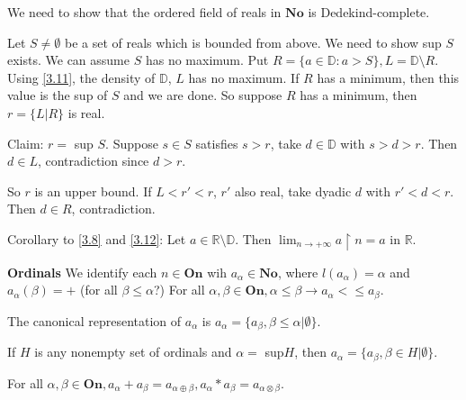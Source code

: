 
We need to show that the ordered field of reals in $\mathbf{No}$ is Dedekind-complete.

Let $S \neq \emptyset$ be a set of reals which is bounded from above. We need to show sup $S$ exists. We can assume $S$ has no maximum. Put $R=\{a \in \mathbb{D}: a>S\}, L=\mathbb{D} \setminus R$. Using \eqref{3.11}, the density of $\mathbb{D}$, $L$ has no maximum. If $R$ has a minimum, then this value is the sup of $S$ and we are done. So suppose $R$ has a minimum, then $r=\{L|R\}$ is real.

Claim: $r=$ sup $S$. Suppose $s \in S$ satisfies $s>r$, take $d \in \mathbb{D}$ with $s>d>r$. Then $d \in L$, contradiction since $d>r$.

So $r$ is an upper bound. If $L<r'<r$, $r'$ also real, take dyadic $d$ with $r'<d<r$. Then $d \in R$, contradiction.

\begin{corollary} %
Corollary to \eqref{3.8} and \eqref{3.12}: Let $a \in \mathbb{R} \setminus \mathbb{D}$. Then $\lim_{n \to +\infty} a \restriction n =a$ in $\mathbb{R}$.
 \end{corollary}

\textbf{Ordinals}
We identify each $n \in \mathbf{On}$ wih $a_\alpha \in \mathbf{No}$, where $l(a_\alpha)=\alpha$ and $a_{\alpha}(\beta)=+$ (for all $\beta \leq \alpha$?) For all $\alpha, \beta \in \mathbf{On}, \alpha \leq \beta \rightarrow a_\alpha <\leq a_\beta$.

The canonical representation of $a_\alpha$ is $a_\alpha = \{a_{\beta}, \beta \leq \alpha | \emptyset \}$.

If $H$ is any nonempty set of ordinals and $\alpha =$ sup$ H$, then $a_\alpha = \{a_{\beta}, \beta \in H | \emptyset \}$.

\begin{proposition} %
For all $\alpha, \beta \in \mathbf{On}, a_\alpha + a_\beta = a_{\alpha \oplus \beta}, a_\alpha * a_\beta = a_{\alpha \otimes \beta}$.
 \end{proposition}


